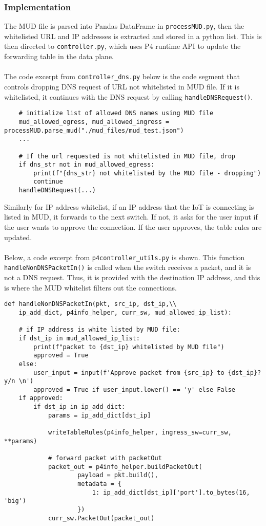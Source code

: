 \subsubsection{Implementation}
The MUD file is parsed into Pandas DataFrame in \verb |processMUD.py|, then the whitelisted URL and IP addresses is extracted and stored in a python list. This is then directed to \verb|controller.py|, which uses P4 runtime API to update the forwarding table in the data plane. \\ 
\\
The code excerpt from \verb|controller_dns.py| below is the code segment that controls dropping DNS request of URL not whitelisted in MUD file. If it is whitelisted, it continues with the DNS request by calling \verb|handleDNSRequest()|.
\begin{lstlisting}
    # initialize list of allowed DNS names using MUD file
    mud_allowed_egress, mud_allowed_ingress = processMUD.parse_mud("./mud_files/mud_test.json")
    ...

    # If the url requested is not whitelisted in MUD file, drop
    if dns_str not in mud_allowed_egress:
        print(f"{dns_str} not whitelisted by the MUD file - dropping")
        continue
    handleDNSRequest(...)
\end{lstlisting}
Similarly for IP address whitelist, if an IP address that the IoT is connecting is listed in MUD, it forwards to the next switch. If not, it asks for the user input if the user wants to approve the connection. If the user approves, the table rules are updated. \\
\\
Below, a code excerpt from \verb|p4controller_utils.py| is shown. This function \verb|handleNonDNSPacketIn()| is called when the switch receives a packet, and it is not a DNS request. Thus, it is provided with the destination IP address, and this is where the MUD whitelist filters out the connections. 

\begin{lstlisting}
def handleNonDNSPacketIn(pkt, src_ip, dst_ip,\\
    ip_add_dict, p4info_helper, curr_sw, mud_allowed_ip_list):

    # if IP address is white listed by MUD file:
    if dst_ip in mud_allowed_ip_list:
        print(f"packet to {dst_ip} whitelisted by MUD file")
        approved = True
    else: 
        user_input = input(f'Approve packet from {src_ip} to {dst_ip}? y/n \n')
        approved = True if user_input.lower() == 'y' else False
    if approved:
        if dst_ip in ip_add_dict:
            params = ip_add_dict[dst_ip]

            writeTableRules(p4info_helper, ingress_sw=curr_sw, **params)

            # forward packet with packetOut
            packet_out = p4info_helper.buildPacketOut(
                    payload = pkt.build(),
                    metadata = {
                        1: ip_add_dict[dst_ip]['port'].to_bytes(16, 'big')
                    })
            curr_sw.PacketOut(packet_out)

\end{lstlisting}
